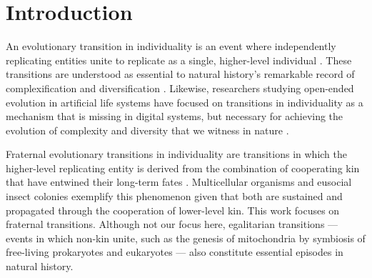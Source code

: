 \section{Introduction}

An evolutionary transition in individuality is an event where independently replicating entities unite to replicate as a single, higher-level individual \citep{smith1997major}.
These transitions are understood as essential to natural history's remarkable record of complexification and diversification \citep{smith1997major}.
Likewise, researchers studying open-ended evolution in artificial life systems have focused on transitions in individuality as a mechanism that is missing in digital systems, but necessary for achieving the evolution of complexity and diversity that we witness in nature \citep{taylor2016open, banzhaf2016defining}.

Fraternal evolutionary transitions in individuality are transitions in which the higher-level replicating entity is derived from the combination of cooperating kin that have entwined their long-term fates \citep{west2015major}.
Multicellular organisms and eusocial insect colonies exemplify this phenomenon \citep{smith1997major} given that both are sustained and propagated through the cooperation of lower-level kin.
This work focuses on fraternal transitions.
Although not our focus here, egalitarian transitions --- events in which non-kin unite, such as the genesis of mitochondria by symbiosis of free-living prokaryotes and eukaryotes \citep{smith1997major} --- also constitute essential episodes in natural history.

